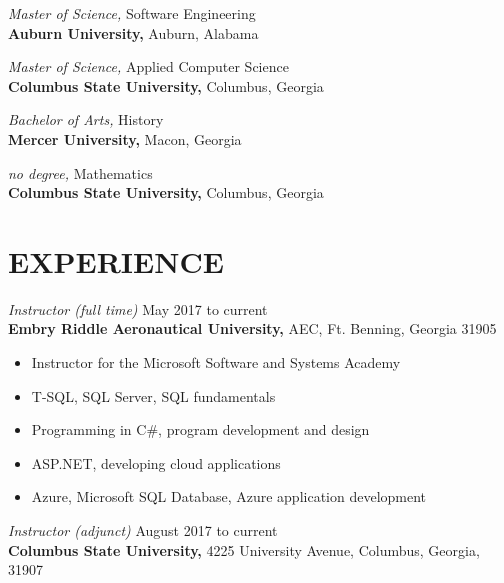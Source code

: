 \documentclass[margin, 10pt]{res} %
\begin{document}
\begin{resume}
{\it Master of Science,} Software Engineering\\
\textbf{Auburn University,} Auburn, Alabama

{\it Master of Science,} Applied Computer Science\\
\textbf{Columbus State University,} Columbus, Georgia

{\it Bachelor of Arts,} History\\
\textbf{Mercer University,} Macon, Georgia

{\it no degree,} Mathematics\\
\textbf{Columbus State University,} Columbus, Georgia

 
\section{EXPERIENCE}
 
%

{\it Instructor (full time)} \hfill May 2017 to current \\
\textbf{Embry Riddle Aeronautical University,} AEC, Ft. Benning, Georgia 31905

\begin{itemize} \itemsep -2pt %
\item Instructor for the Microsoft Software and Systems Academy
\item T-SQL, SQL Server, SQL fundamentals
\item Programming in C\#, program development and design
\item ASP.NET, developing cloud applications
\item Azure, Microsoft SQL Database, Azure application development
\end{itemize}
 
{\it Instructor (adjunct)} \hfill August 2017 to current \\
\textbf{Columbus State University,} 4225 University Avenue, Columbus, Georgia, 31907


\end{resume}
\end{document}
